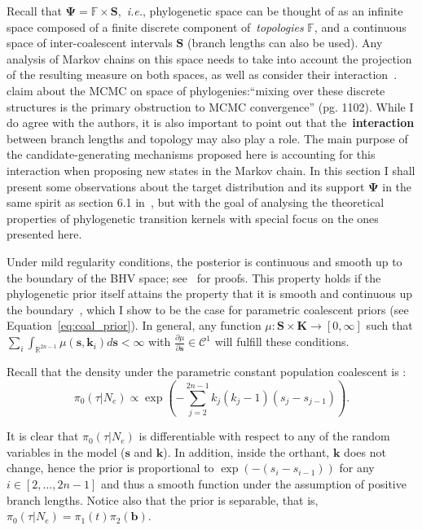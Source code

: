 Recall that $\boldsymbol\Psi = \mathbb{F} \times \mathbf{S}$,~\textit{i.e.}, phylogenetic space can be thought of as an infinite space composed of a finite discrete component of~\textit{topologies} $\mathbb{F}$, and a continuous space of inter-coalescent intervals $\mathbf{S}$ (branch lengths can also be used).
Any analysis of Markov chains on this space needs to take into account the projection of the resulting measure on both spaces, as well as consider their interaction~\citep{Gavryushkin2016b}.
\cite{Gavryushkin2016} claim about the MCMC on space of phylogenies:``mixing over these discrete structures is the primary obstruction to MCMC convergence'' (pg. 1102).
While I do agree with the authors, it is also important to point out that the~\textbf{interaction} between branch lengths and topology may also play a role.
The main purpose of the candidate-generating mechanisms proposed here is accounting for this interaction when proposing new states in the Markov chain.
In this section I shall present some observations about the target distribution and its support $\boldsymbol\Psi$ in the same spirit as section 6.1 in~\cite{Dinh2017}, but with the goal of analysing the theoretical properties of phylogenetic transition kernels with special focus on the ones presented here.

Under mild regularity conditions, the posterior is continuous and smooth up to the boundary of the BHV space; see~\cite{Dinh2017} for proofs.
This  property holds if the phylogenetic prior itself attains the property that it is smooth and continuous up the boundary~\citep[Assumption 2.3]{Dinh2017},
which I show to be the case for parametric coalescent priors (see Equation~\ref{eq:coal_prior}).
In general, any function $\mu : \boldsymbol S \times \boldsymbol K \to [0, \infty]$ such that $\sum_i\int_{\mathbb{R}^{2n-1}} \mu (\boldsymbol s, \boldsymbol k_i) d\boldsymbol s < \infty$ with $\frac{\partial \mu}{\partial \boldsymbol s} \in \mathcal{C}^1$  will fulfill these conditions.   

Recall that the density under the parametric constant population coalescent is :
\begin{equation}
\label{eq:coal_prior_short} 
\pi_0(\tau| N_e) \propto \exp\left(-\sum_{j=2}^{2n-1} k_j(k_j -1)(s_j - s_{j-1}) \right).
\end{equation}

It is clear that $\pi_0(\tau| N_e)$ is differentiable with respect to any of the random variables in the model ($\boldsymbol s$ and $\boldsymbol k$).
In addition, inside the orthant, $\boldsymbol k$ does not change, hence the prior is  proportional to $\exp(-(s_i-s_{i-1}))$ for any $ i \in [2, \ldots, 2n-1]$ and thus a smooth function under the assumption of positive branch lengths.
Notice also that the prior is separable, that is, $\pi_0(\tau| N_e) = \pi_1(t)\pi_2(\boldsymbol b)$.

